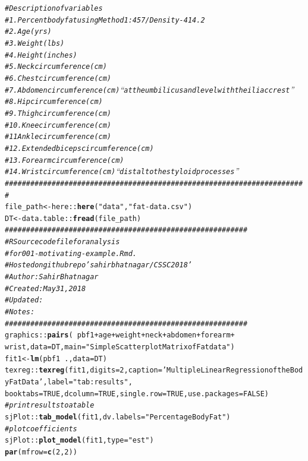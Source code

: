 \documentclass[11pt,letter]{article}\usepackage[]{graphicx}\usepackage[]{color}
\makeatletter
\newcommand{\hlnum}[1]{\textcolor[rgb]{0.686,0.059,0.569}{#1}}%
\newcommand{\hlstr}[1]{\textcolor[rgb]{0.192,0.494,0.8}{#1}}%
\newcommand{\hlcom}[1]{\textcolor[rgb]{0.678,0.584,0.686}{\textit{#1}}}%
\newcommand{\hlopt}[1]{\textcolor[rgb]{0,0,0}{#1}}%
\newcommand{\hlstd}[1]{\textcolor[rgb]{0.345,0.345,0.345}{#1}}%
\newcommand{\hlkwb}[1]{\textcolor[rgb]{0.69,0.353,0.396}{#1}}%
\newcommand{\hlkwc}[1]{\textcolor[rgb]{0.333,0.667,0.333}{#1}}%
\newcommand{\hlkwd}[1]{\textcolor[rgb]{0.737,0.353,0.396}{\textbf{#1}}}%
\newenvironment{kframe}{%
 \def\at@end@of@kframe{}%
 \ifinner\ifhmode%
  \def\at@end@of@kframe{\end{minipage}}%
  \begin{minipage}{\columnwidth}%
 \fi\fi%
 \def\FrameCommand##1{\hskip\@totalleftmargin \hskip-\fboxsep
 \colorbox{shadecolor}{##1}\hskip-\fboxsep
     \hskip-\linewidth \hskip-\@totalleftmargin \hskip\columnwidth}%
 \MakeFramed {\advance\hsize-\width
   \@totalleftmargin\z@ \linewidth\hsize
   \@setminipage}}%
 {\par\unskip\endMakeFramed%
 \at@end@of@kframe}
\newenvironment{knitrout}{}{} %
\makeatother
\begin{document}
\begin{knitrout}
\begin{kframe}
\begin{alltt}
\hlcom{# Description of variables}
\hlcom{# 1. Percent body fat using Method 1: 457/Density - 414.2}
\hlcom{# 2. Age (yrs)}
\hlcom{# 3. Weight (lbs)}
\hlcom{# 4. Height (inches)}
\hlcom{# 5. Neck circumference (cm)}
\hlcom{# 6. Chest circumference (cm)}
\hlcom{# 7. Abdomen circumference (cm) “at the umbilicus and level with the iliac crest”}
\hlcom{# 8. Hip circumference (cm)}
\hlcom{# 9. Thigh circumference (cm)}
\hlcom{# 10. Knee circumference (cm)}
\hlcom{# 11 Ankle circumference (cm)}
\hlcom{# 12. Extended biceps circumference (cm)}
\hlcom{# 13. Forearm circumference (cm)}
\hlcom{# 14. Wrist circumference (cm) “distal to the styloid processes”}
\hlcom{#######################################################################}
\hlstd{file_path} \hlkwb{<-} \hlstd{here}\hlopt{::}\hlkwd{here}\hlstd{(}\hlstr{"data"}\hlstd{,} \hlstr{"fat-data.csv"}\hlstd{)}
\hlstd{DT} \hlkwb{<-} \hlstd{data.table}\hlopt{::}\hlkwd{fread}\hlstd{(file_path)}
\hlcom{#########################################################}
\hlcom{# R Source code file for analysis}
\hlcom{# for 001-motivating-example.Rmd. }
\hlcom{# Hosted on github repo 'sahirbhatnagar/CSSC2018'}
\hlcom{# Author: Sahir Bhatnagar}
\hlcom{# Created: May 31, 2018}
\hlcom{# Updated: }
\hlcom{# Notes: }
\hlcom{#########################################################}
\hlstd{graphics}\hlopt{::}\hlkwd{pairs}\hlstd{(}\hlopt{~} \hlstd{pbf1} \hlopt{+} \hlstd{age} \hlopt{+} \hlstd{weight} \hlopt{+} \hlstd{neck} \hlopt{+} \hlstd{abdomen} \hlopt{+} \hlstd{forearm} \hlopt{+}
                  \hlstd{wrist,} \hlkwc{data} \hlstd{= DT,} \hlkwc{main} \hlstd{=} \hlstr{"Simple Scatterplot Matrix of Fat data"}\hlstd{)}
\hlstd{fit1} \hlkwb{<-} \hlkwd{lm}\hlstd{(pbf1} \hlopt{~} \hlstd{.,} \hlkwc{data} \hlstd{= DT)}
\hlstd{texreg}\hlopt{::}\hlkwd{texreg}\hlstd{(fit1,} \hlkwc{digits}\hlstd{=}\hlnum{2}\hlstd{,} \hlkwc{caption}\hlstd{=}\hlstr{'Multiple Linear Regression of the Body Fat Data'}\hlstd{,} \hlkwc{label} \hlstd{=} \hlstr{"tab:results"}\hlstd{,}
               \hlkwc{booktabs} \hlstd{=} \hlnum{TRUE}\hlstd{,} \hlkwc{dcolumn} \hlstd{=} \hlnum{TRUE}\hlstd{,} \hlkwc{single.row} \hlstd{=} \hlnum{TRUE}\hlstd{,} \hlkwc{use.packages} \hlstd{=} \hlnum{FALSE}\hlstd{)}
\hlcom{# print results to a table}
\hlstd{sjPlot}\hlopt{::}\hlkwd{tab_model}\hlstd{(fit1,} \hlkwc{dv.labels} \hlstd{=} \hlstr{"Percentage Body Fat"}\hlstd{)}
\hlcom{# plot coefficients}
\hlstd{sjPlot}\hlopt{::}\hlkwd{plot_model}\hlstd{(fit1,} \hlkwc{type} \hlstd{=} \hlstr{"est"}\hlstd{)}
\hlkwd{par}\hlstd{(}\hlkwc{mfrow}\hlstd{=}\hlkwd{c}\hlstd{(}\hlnum{2}\hlstd{,}\hlnum{2}\hlstd{))}

\end{alltt}
\end{kframe}
\end{knitrout}
\end{document}
